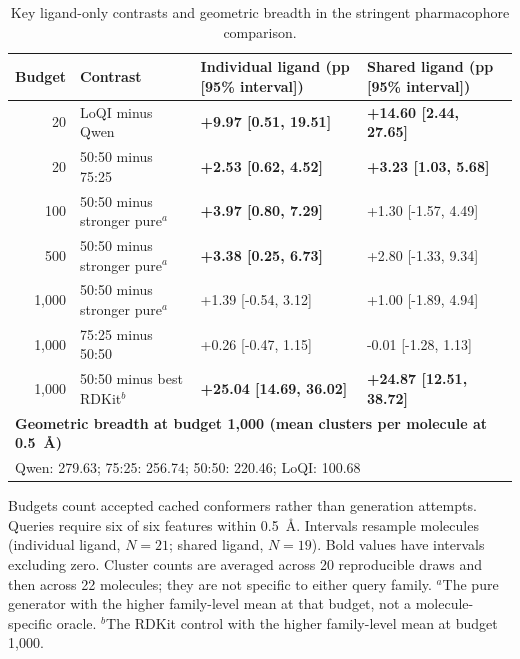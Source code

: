 \begin{table}[htbp]
\centering\footnotesize
\setlength{\tabcolsep}{5.5pt}
\renewcommand{\arraystretch}{1.22}
\caption{Key ligand-only contrasts and geometric breadth in the stringent pharmacophore comparison.}
\label{tab:pharmacophore-mixture}
\par\smallskip
\begin{tabular*}{\linewidth}{@{\extracolsep{\fill}}rlll@{}}
\toprule
\textbf{Budget} & \textbf{Contrast} & \textbf{Individual ligand (pp [95\% interval])} & \textbf{Shared ligand (pp [95\% interval])} \\
\midrule
20 & LoQI minus Qwen & \textbf{+9.97 [0.51, 19.51]} & \textbf{+14.60 [2.44, 27.65]} \\
20 & 50:50 minus 75:25 & \textbf{+2.53 [0.62, 4.52]} & \textbf{+3.23 [1.03, 5.68]} \\
100 & 50:50 minus stronger pure$^{a}$ & \textbf{+3.97 [0.80, 7.29]} & +1.30 [-1.57, 4.49] \\
500 & 50:50 minus stronger pure$^{a}$ & \textbf{+3.38 [0.25, 6.73]} & +2.80 [-1.33, 9.34] \\
1,000 & 50:50 minus stronger pure$^{a}$ & +1.39 [-0.54, 3.12] & +1.00 [-1.89, 4.94] \\
1,000 & 75:25 minus 50:50 & +0.26 [-0.47, 1.15] & -0.01 [-1.28, 1.13] \\
1,000 & 50:50 minus best RDKit$^{b}$ & \textbf{+25.04 [14.69, 36.02]} & \textbf{+24.87 [12.51, 38.72]} \\
\midrule
\multicolumn{4}{l}{\textbf{Geometric breadth at budget 1,000 (mean clusters per molecule at 0.5~\AA{})}} \\
\multicolumn{4}{l}{Qwen: 279.63; 75:25: 256.74; 50:50: 220.46; LoQI: 100.68} \\
\bottomrule
\end{tabular*}
\par\smallskip
\begin{minipage}{\linewidth}
Budgets count accepted cached conformers rather than generation attempts. Queries require six of six features within 0.5~\AA{}. Intervals resample molecules (individual ligand, $N=21$; shared ligand, $N=19$). Bold values have intervals excluding zero. Cluster counts are averaged across 20 reproducible draws and then across 22 molecules; they are not specific to either query family. $^{a}$The pure generator with the higher family-level mean at that budget, not a molecule-specific oracle. $^{b}$The RDKit control with the higher family-level mean at budget 1,000.
\end{minipage}
\end{table}

